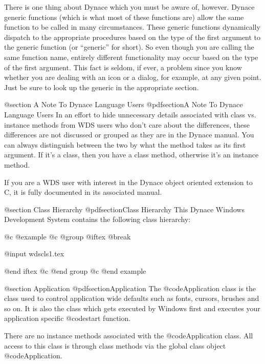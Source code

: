 There is one thing about Dynace which you must be aware of, however.
Dynace generic functions (which is what most of these functions are)
allow the same function to be called in many circumstances.  These
generic functions dynamically dispatch to the appropriate procedures
based on the type of the first argument to the generic function (or
``generic'' for short).  So even though you are calling the same
function name, entirely different functionality may occur based on the
type of the first argument.  This fact is seldom, if ever, a problem
since you know whether you are dealing with an icon or a dialog, for
example, at any given point.  Just be sure to look up the generic in
the appropriate section.


@section A Note To Dynace Language Users
@pdfsection{A Note To Dynace Language Users}
In an effort to hide unnecessary details associated with class vs.
instance methods from WDS users who don't care about the differences,
these differences are not discussed or grouped as they are in the
Dynace manual.  You can always distinguish between the two by what
the method takes as its first argument.  If it's a class, then you
have a class method, otherwise it's an instance method.

If you are a WDS user with interest in the Dynace object oriented
extension to C, it is fully documented in its associated manual.




@section Class Hierarchy
@pdfsection{Class Hierarchy}
This Dynace Windows Development System contains the following class
hierarchy:

@c @example
@c @group
@iftex
@break

@input wdscls1.tex


@end iftex
@c @end group
@c @end example





@section Application
@pdfsection{Application}
The @code{Application} class is the class used to control application
wide defaults such as fonts, cursors, brushes and so on.  It is also
the class which gets executed by Windows first and executes your
application specific @code{start} function.

There are no instance methods associated with the @code{Application} class.
All access to this class is through class methods via the global class
object @code{Application}.














